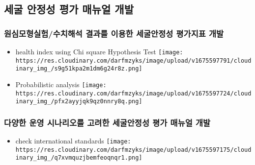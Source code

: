 \documentclass[
  letterpaper,
  DIV=11,
  numbers=noendperiod]{scrreprt}
\providecommand{\tightlist}{%
  \setlength{\itemsep}{0pt}\setlength{\parskip}{0pt}}\usepackage{longtable,booktabs,array}
\begin{document}
\hypertarget{uxc138uxad74-uxc548uxc815uxc131-uxd3c9uxac00-uxb9e4uxb274uxc5bc-uxac1cuxbc1c}{%
\subsection{세굴 안정성 평가 매뉴얼
개발}\label{uxc138uxad74-uxc548uxc815uxc131-uxd3c9uxac00-uxb9e4uxb274uxc5bc-uxac1cuxbc1c}}

\hypertarget{uxc6d0uxc2ecuxbaa8uxd615uxc2e4uxd5d8uxc218uxce58uxd574uxc11d-uxacb0uxacfcuxb97c-uxc774uxc6a9uxd55c-uxc138uxad74uxc548uxc815uxc131-uxd3c9uxac00uxc9c0uxd45c-uxac1cuxbc1c}{%
\subsubsection{원심모형실험/수치해석 결과를 이용한 세굴안정성 평가지표
개발}\label{uxc6d0uxc2ecuxbaa8uxd615uxc2e4uxd5d8uxc218uxce58uxd574uxc11d-uxacb0uxacfcuxb97c-uxc774uxc6a9uxd55c-uxc138uxad74uxc548uxc815uxc131-uxd3c9uxac00uxc9c0uxd45c-uxac1cuxbc1c}}

\begin{itemize}
\item
  health index using Chi square Hypothesis Test
  \texttt{[image: https://res.cloudinary.com/darfmzyks/image/upload/v1675597791/cloudinary\_img\_/s9g51kpa2m1dm6g24r8z.png]}
\item
  Probabilistic analysis
  \texttt{[image: https://res.cloudinary.com/darfmzyks/image/upload/v1675597724/cloudinary\_img\_/pfx2ayyjqk9qz0nnry8q.png]}
\end{itemize}

\hypertarget{uxb2e4uxc591uxd55c-uxc6b4uxc601-uxc2dcuxb098uxb9acuxc624uxb97c-uxace0uxb824uxd55c-uxc138uxad74uxc548uxc815uxc131-uxd3c9uxac00-uxb9e4uxb274uxc5bc-uxac1cuxbc1c}{%
\subsubsection{다양한 운영 시나리오를 고려한 세굴안정성 평가 매뉴얼
개발}\label{uxb2e4uxc591uxd55c-uxc6b4uxc601-uxc2dcuxb098uxb9acuxc624uxb97c-uxace0uxb824uxd55c-uxc138uxad74uxc548uxc815uxc131-uxd3c9uxac00-uxb9e4uxb274uxc5bc-uxac1cuxbc1c}}

\begin{itemize}
\tightlist
\item
  check international standards
  \texttt{[image: https://res.cloudinary.com/darfmzyks/image/upload/v1675597175/cloudinary\_img\_/q7xvmquzjbemfeoqnqr1.png]}
\end{itemize}
\end{document}
